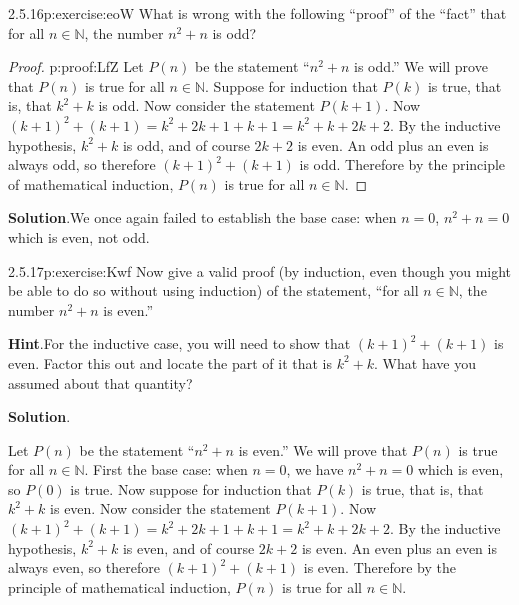 \documentclass[twoside,11pt,]{book}
\newcommand{\blocktitlefont}{\relax}
\numberwithin{equation}{chapter}
\newcommand{\N}{\mathbb N}
\begin{document}
\begin{divisionsolution}{2.5.16}{}{p:exercise:eoW}%
What is wrong with the following ``proof'' of the ``fact'' that for all \(n \in \N\), the number \(n^2 + n\) is odd?%
\begin{proof}{}{p:proof:LfZ}
Let \(P(n)\) be the statement ``\(n^2 + n\) is odd.'' We will prove that \(P(n)\) is true for all \(n \in \N\). Suppose for induction that \(P(k)\) is true, that is, that \(k^2 + k\) is odd. Now consider the statement \(P(k+1)\). Now \((k+1)^2 + (k+1) = k^2 + 2k + 1 + k + 1 = k^2 + k + 2k + 2\). By the inductive hypothesis, \(k^2 + k\) is odd, and of course \(2k + 2\) is even. An odd plus an even is always odd, so therefore \((k+1)^2 + (k+1)\) is odd. Therefore by the principle of mathematical induction, \(P(n)\) is true for all \(n \in \N\).%
\end{proof}
\par\smallskip%
\noindent\textbf{\blocktitlefont Solution}.\quad{}We once again failed to establish the base case: when \(n = 0\), \(n^2 + n = 0\) which is even, not odd.%
\end{divisionsolution}%
\begin{divisionsolution}{2.5.17}{}{p:exercise:Kwf}%
Now give a valid proof (by induction, even though you might be able to do so without using induction) of the statement, ``for all \(n \in \N\), the number \(n^2 + n\) is even.''%
\par\smallskip%
\noindent\textbf{\blocktitlefont Hint}.\quad{}For the inductive case, you will need to show that \((k+1)^2 + (k+1)\) is even.  Factor this out and locate the part of it that is \(k^2 + k\).  What have you assumed about that quantity?%
\par\smallskip%
\noindent\textbf{\blocktitlefont Solution}.\quad{}\begin{solutionproof}
Let \(P(n)\) be the statement ``\(n^2 + n\) is even.'' We will prove that \(P(n)\) is true for all \(n \in \N\). First the base case: when \(n = 0\), we have \(n^2 + n = 0\) which is even, so \(P(0)\) is true. Now suppose for induction that \(P(k)\) is true, that is, that \(k^2 + k\) is even. Now consider the statement \(P(k+1)\). Now \((k+1)^2 + (k+1) = k^2 + 2k + 1 + k + 1 = k^2 + k + 2k + 2\). By the inductive hypothesis, \(k^2 + k\) is even, and of course \(2k + 2\) is even. An even plus an even is always even, so therefore \((k+1)^2 + (k+1)\) is even. Therefore by the principle of mathematical induction, \(P(n)\) is true for all \(n \in \N\).%
\end{solutionproof}
\end{divisionsolution}%
\end{document}
